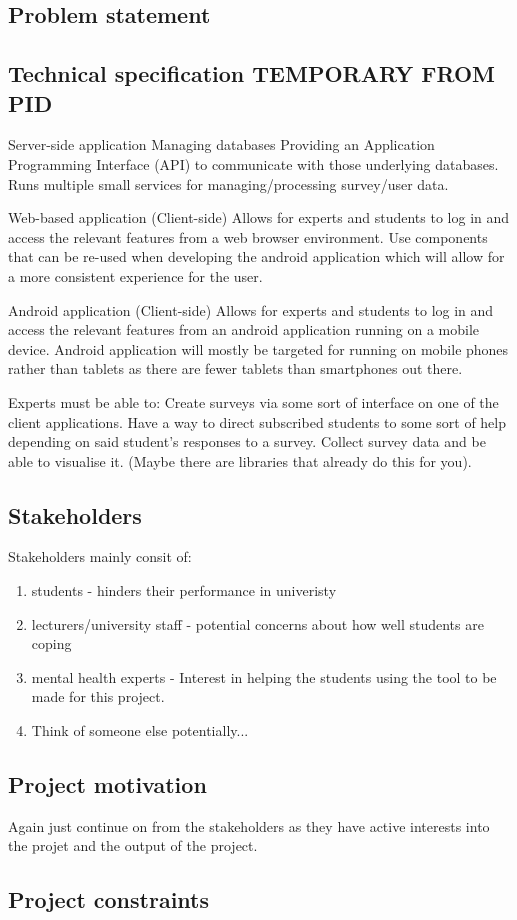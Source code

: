 \subsection{Problem statement}


\subsection{Technical specification \textbf{TEMPORARY FROM PID}}

Server-side application
Managing databases
Providing an Application Programming Interface (API) to communicate with those underlying databases.
Runs multiple small services for managing/processing survey/user data.

Web-based application (Client-side)
Allows for experts and students to log in and access the relevant features from a web browser environment.
Use components that can be re-used when developing the android application which will allow for a more consistent experience for the user.

Android application (Client-side)
Allows for experts and students to log in and access the relevant features from an android application running on a mobile device. 
Android application will mostly be targeted for running on mobile phones rather than tablets as there are fewer tablets than smartphones out there.

Experts must be able to:
Create surveys via some sort of interface on one of the client applications.
Have a way to direct subscribed students to some sort of help depending on said student’s responses to a survey.
Collect survey data and be able to visualise it. (Maybe there are libraries that already do this for you).

\subsection{Stakeholders}

Stakeholders mainly consit of: 

\begin{enumerate}
    \item students - hinders their performance in univeristy
    \item lecturers/university staff - potential concerns about how well students are coping
    \item mental health experts - Interest in helping the students using the tool to be made for this project.
    \item Think of someone else potentially...  
\end{enumerate}


\subsection{Project motivation}

Again just continue on from the stakeholders as they have active interests into the projet and the output of the project.

\subsection{Project constraints}